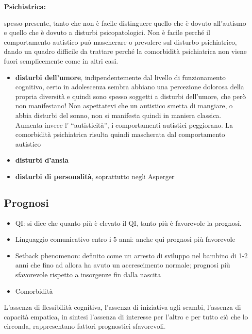 \textbf{Psichiatrica:}

spesso presente, tanto che non è facile distinguere quello che è dovuto
all'autismo e quello che è dovuto a disturbi psicopatologici. Non è
facile perché il comportamento autistico può mascherare o prevalere sul
disturbo psichiatrico, dando un quadro difficile da trattare perché la
comorbidità psichiatrica non viene fuori semplicemente come in altri
casi.

\begin{itemize}
\item
  \textbf{disturbi dell'umore}, indipendentemente dal livello di
  funzionamento cognitivo, certo in adolescenza sembra abbiano una
  percezione dolorosa della propria diversità e quindi sono spesso
  soggetti a disturbi dell'umore, che però non manifestano! Non
  aspettatevi che un autistico smetta di mangiare, o abbia disturbi del
  sonno, non si manifesta quindi in maniera classica. Aumenta invece l'
  ``autisticità'', i comportamenti autistici peggiorano. La comorbidità
  psichiatrica risulta quindi mascherata dal comportamento autistico
\item
  \textbf{disturbi d'ansia}
\item
  \textbf{disturbi di personalità}, soprattutto negli Asperger
\end{itemize}

\subsection{Prognosi}

\begin{itemize}
\item
  QI: si dice che quanto più è elevato il QI, tanto più è favorevole la
  prognosi.
\item
  Linguaggio comunicativo entro i 5 anni: anche qui prognosi più
  favorevole
\item
  Setback phenomenon: definito come un arresto di sviluppo nel bambino
  di 1-2 anni che fino ad allora ha avuto un accrescimento normale;
  prognosi più sfavorevole rispetto a insorgenze fin dalla nascita
\item
  Comorbidità
\end{itemize}

L'assenza di flessibilità cognitiva, l'assenza di iniziativa agli
scambi, l'assenza di capacità empatica, in sintesi l'assenza di
interesse per l'altro e per tutto ciò che lo circonda, rappresentano
fattori prognostici sfavorevoli.

